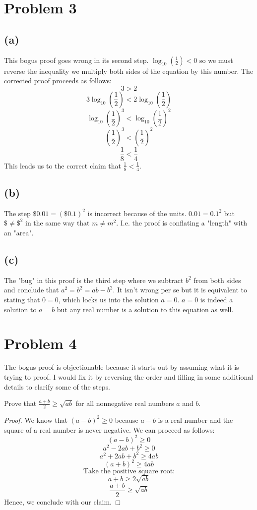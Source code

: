 \documentclass{article}
\begin{document}
\section{Problem 3}
\subsection{(a)}
This bogus proof goes wrong in its second step. $\log_{10} (\frac{1}{2}) < 0$ so we must reverse the inequality we multiply both sides of the equation by this number. The corrected proof proceeds as follows:
\[
	3 > 2
\]
\[
	3 \log_{10} \left(\frac{1}{2}\right) < 2 \log_{10} \left(\frac{1}{2}\right)
\]
\[
	\log_{10} \left(\frac{1}{2}\right)^3 < \log_{10} \left(\frac{1}{2}\right)^2
\]
\[
	\left(\frac{1}{2}\right)^3 < \left(\frac{1}{2}\right)^2
\]
\[
	\frac{1}{8} < \frac{1}{4}
\]
This leads us to the correct claim that $\frac{1}{8} < \frac{1}{4}$.
\subsection{(b)}
The step $\$0.01 = (\$0.1)^2$ is incorrect because of the units. $0.01 = 0.1^2$ but $\$ \neq \$^2$ in the same way that $m \neq m^2$. I.e. the proof is conflating a "length" with an "area".
\subsection{(c)}
The "bug" in this proof is the third step where we subtract $b^2$ from both sides and conclude that $a^2 = b^2 = ab - b^2$. It isn't wrong per se but it is equivalent to stating that $0 = 0$, which locks us into the
solution $a = 0$. $a = 0$ is indeed a solution to $a = b$ but any real number is a solution to this equation as well.

\pagebreak

\section{Problem 4}
The bogus proof is objectionable because it starts out by assuming what it is trying to proof. I would fix it by reversing the order and filling in some additional details to clarify some of the steps.

Prove that $\frac{a + b}{2} \geq \sqrt{ab}$ for all nonnegative real numbers $a$ and $b$.

\begin{proof}
	We know that $(a - b)^2 \geq 0$ because $a - b$ is a real number and the square of a real number is never negative. We can proceed as follows:
	\[
		(a - b)^2 \geq 0
	\]
	\[
		a^2 - 2ab + b^2 \geq 0
	\]
	\[
		a^2 + 2ab + b^2 \geq 4ab
	\]
	\[
		(a + b)^2 \geq 4ab
	\]
	\[
		\text{Take the positive square root:}
	\]
	\[
		a + b \geq 2\sqrt{ab}
	\]
	\[
		\frac{a + b}{2} \geq \sqrt{ab}
	\]
	Hence, we conclude with our claim.
\end{proof}
\end{document}
